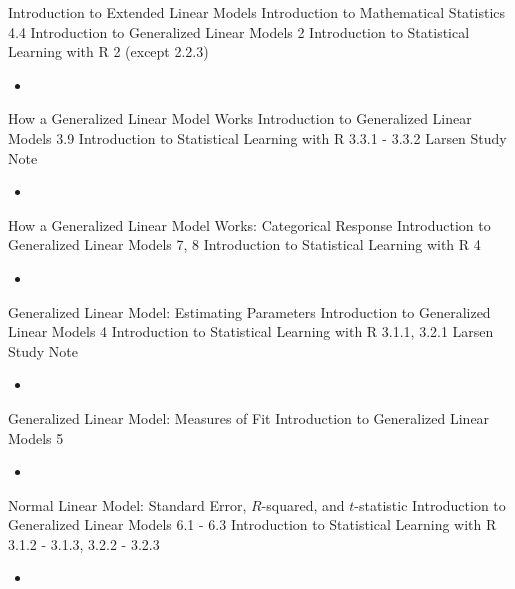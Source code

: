 \documentclass[12pt, titlepage, french]{report}
\begin{document}
\begin{CHPT_SUMM_AUTO_NUMB}[label = {L.-42}]{Introduction to Extended Linear Models}
Introduction to Mathematical Statistics 4.4
Introduction to Generalized Linear Models 2
Introduction to Statistical Learning with R 2 (except 2.2.3)
	\begin{itemize}
		\item	
	\end{itemize}
\end{CHPT_SUMM_AUTO_NUMB}

\begin{CHPT_SUMM_AUTO_NUMB}[label = {L.-43}]{How a Generalized Linear Model Works}
Introduction to Generalized Linear Models 3.9
Introduction to Statistical Learning with R 3.3.1 - 3.3.2
Larsen Study Note
	\begin{itemize}
		\item	
	\end{itemize}
\end{CHPT_SUMM_AUTO_NUMB}

\begin{CHPT_SUMM_AUTO_NUMB}[label = {L.-44}]{How a Generalized Linear Model Works: Categorical Response}
Introduction to Generalized Linear Models 7, 8
Introduction to Statistical Learning with R 4
	\begin{itemize}
		\item	
	\end{itemize}
\end{CHPT_SUMM_AUTO_NUMB}

\begin{CHPT_SUMM_AUTO_NUMB}[label = {L.-45}]{Generalized Linear Model: Estimating Parameters}
Introduction to Generalized Linear Models 4
Introduction to Statistical Learning with R 3.1.1, 3.2.1
Larsen Study Note
	\begin{itemize}
		\item	
	\end{itemize}
\end{CHPT_SUMM_AUTO_NUMB}

\begin{CHPT_SUMM_AUTO_NUMB}[label = {L.-46}]{Generalized Linear Model: Measures of Fit}
Introduction to Generalized Linear Models 5
	\begin{itemize}
		\item	
	\end{itemize}
\end{CHPT_SUMM_AUTO_NUMB}

\begin{CHPT_SUMM_AUTO_NUMB}[label = {L.-47}]{{Normal Linear Model: Standard Error, $R$-squared, and $t$-statistic}}
Introduction to Generalized Linear Models 6.1 - 6.3
Introduction to Statistical Learning with R 3.1.2 - 3.1.3, 3.2.2 - 3.2.3
	\begin{itemize}
		\item	
	\end{itemize}
\end{CHPT_SUMM_AUTO_NUMB}
\end{document}
